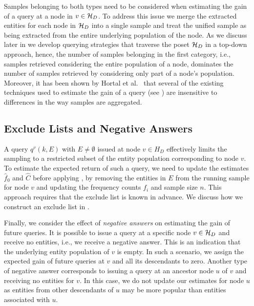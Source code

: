 Samples belonging to both types need to be considered when estimating the gain of a query at a node in $v \in \mathcal{H}_D$. To address this issue we merge the extracted entities for each node in $\mathcal{H}_D$ into a single sample and treat the unified sample as being extracted from the entire underlying population of the node. As we discuss later in  we develop querying strategies that traverse the poset $\mathcal{H}_D$ in a top-down approach, hence, the number of samples belonging in the first category, i.e., samples retrieved considering the entire population of a node, dominates the number of samples retrieved by considering only part of a node's population. Moreover, it has been shown by Hortal et al.~\cite{hortal2006evaluating} that several of the existing techniques used to estimate the gain of a query (see ) are insensitive to differences in the way samples are aggregated.

\subsection{Exclude Lists and Negative Answers}
\label{sec:excludelist}
A query $q^v(k, E)$ with $E \ne \emptyset$ issued at node $v \in H_D$ effectively limits the sampling to a restricted subset of the entity population corresponding to node $v$. To estimate the expected return of such a query, we need to update the estimates $\hat{f}_0$ and $\hat{C}$ before applying , by removing the entities in $E$ from the running sample for node $v$ and updating the frequency counts $f_i$ and sample size $n$. This approach requires that the exclude list is known in advance. We discuss how we construct an exclude list in .

Finally, we consider the effect of {\em negative answers} on estimating the gain of future queries. It is possible to issue a query at a specific node $v \in \mathcal{H}_D$ and receive no entities, i.e., we receive a negative answer. This is an indication that the underlying entity population of $v$ is empty. In such a scenario, we assign the expected gain of future queries at $v$ and all its descendants to zero. Another type of negative answer corresponds to issuing a query at an ancestor node $u$ of $v$ and receiving no entities for $v$. In this case, we do not update our estimates for node $u$ as entities from other descendants of $u$ may be more popular than entities associated with $u$.

